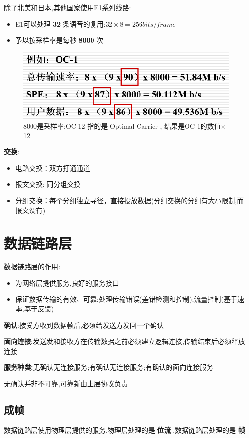 \documentclass[UTF8,a4paper]{ctexart}
\begin{document}
  除了北美和日本,其他国家使用E1系列线路:
  \begin{itemize}
    \item E1可以处理 \textbf{32} 条语音的复用:$32\times 8 = 256 bits/frame$
    \item 予以按采样率是每秒 \textbf{8000} 次
  \end{itemize}
  \begin{figure}[H]
    \centering
    \includegraphics[scale = 0.3]{assets/jisuanjiwangluo_91e6a.png}
    \caption{8000是采样率;OC-12 指的是 Optimal Carrier , 结果是OC-1的数值$\times$12}
  \end{figure}

  \textbf{交换}:
  \begin{itemize}
    \item 电路交换：双方打通通道
    \item 报文交换: 同分组交换
    \item 分组交换：每个分组独立寻径，直接投放数据(分组交换的分组有大小限制,而报文没有)
  \end{itemize}

  \section{数据链路层}
  数据链路层的作用:
  \begin{itemize}
    \item 为网络层提供服务,良好的服务接口
    \item 保证数据传输的有效、可靠:处理传输错误(差错检测和控制);流量控制(基于速率,基于反馈)
  \end{itemize}

  \textbf{确认}:接受方收到数据帧后,必须给发送方发回一个确认

  \textbf{面向连接}:发送发和接收方在传输数据之前必须建立逻辑连接,传输结束后必须释放连接

  \textbf{服务种类:}无确认无连接服务;有确认无连接服务;有确认的面向连接服务

  无确认并非不可靠,可靠新由上层协议负责

  \subsection{成帧}
  数据链路层使用物理层提供的服务,物理层处理的是 \textbf{位流} ,数据链路层处理的是 \textbf{帧}
\end{document}
